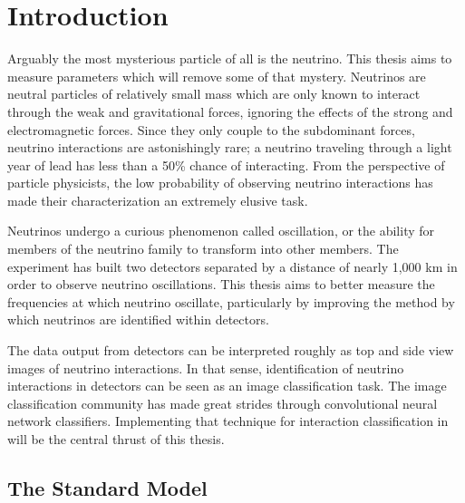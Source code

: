 \chapter{Introduction}
\label{intro_chapter}


Arguably the most mysterious particle of all is the neutrino.
This thesis aims to measure parameters which will remove some of that mystery.
Neutrinos are neutral particles of relatively small mass which are only
known to interact through the weak and gravitational forces, ignoring the
effects of the strong and electromagnetic forces.
Since they only couple to the subdominant forces, neutrino interactions are
astonishingly rare; a neutrino traveling through a light year of lead has less
than a 50\% chance of interacting.  From the perspective of particle
physicists, the low probability of observing neutrino interactions has made
their characterization an extremely elusive task.

Neutrinos undergo a curious phenomenon called oscillation, or the ability for
members of the neutrino family to transform into other members.  The \nova
experiment has built two detectors separated by a distance of nearly 1,000 km
in order to observe neutrino oscillations.  This thesis aims to better measure
the frequencies at which neutrino oscillate, particularly by improving the
method by which neutrinos are identified within \nova detectors.


The data output from \nova detectors can be interpreted roughly as top and side
view images of neutrino interactions.  In that sense, identification of
neutrino interactions in \nova detectors can be seen as an image classification
task.  The image classification community has made great strides through
convolutional neural network classifiers.  Implementing that technique for
interaction classification in \nova will be the central thrust of this thesis.



\section{The Standard Model}

